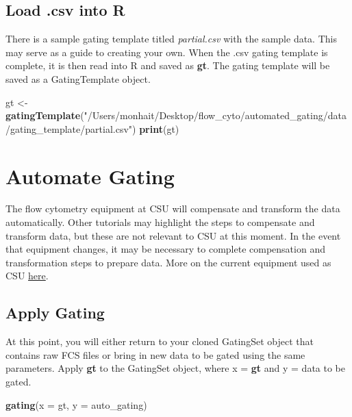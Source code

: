 \documentclass[]{book}
\newenvironment{Shaded}{\begin{snugshade}}{\end{snugshade}}
\newcommand{\DataTypeTok}[1]{\textcolor[rgb]{0.13,0.29,0.53}{#1}}
\newcommand{\KeywordTok}[1]{\textcolor[rgb]{0.13,0.29,0.53}{\textbf{#1}}}
\newcommand{\NormalTok}[1]{#1}
\newcommand{\StringTok}[1]{\textcolor[rgb]{0.31,0.60,0.02}{#1}}
\begin{document}
\hypertarget{load-.csv-into-r}{%
\section{Load .csv into R}\label{load-.csv-into-r}}

There is a sample gating template titled \emph{partial.csv} with the sample data. This may serve as a guide to creating your own. When the .csv gating template is complete, it is then read into R and saved as \textbf{gt}. The gating template will be saved as a GatingTemplate object.

\begin{Shaded}
\begin{Highlighting}[]
\NormalTok{gt <-}\StringTok{ }\KeywordTok{gatingTemplate}\NormalTok{(}\StringTok{"/Users/monhait/Desktop/flow_cyto/automated_gating/data/gating_template/partial.csv"}\NormalTok{)}
\KeywordTok{print}\NormalTok{(gt)}
\end{Highlighting}
\end{Shaded}

\hypertarget{automate-gating}{%
\chapter{Automate Gating}\label{automate-gating}}

The flow cytometry equipment at CSU will compensate and transform the data automatically. Other tutorials may highlight the steps to compensate and transform data, but these are not relevant to CSU at this moment. In the event that equipment changes, it may be necessary to complete compensation and transformation steps to prepare data. More on the current equipment used as CSU \href{https://www.umassmed.edu/facslab/instrument/core-cytek-aurora2/}{here}.

\hypertarget{apply-gating}{%
\section{Apply Gating}\label{apply-gating}}

At this point, you will either return to your cloned GatingSet object that contains raw FCS files or bring in new data to be gated using the same parameters. Apply \textbf{gt} to the GatingSet object, where x = \textbf{gt} and y = data to be gated.

\begin{Shaded}
\begin{Highlighting}[]
\KeywordTok{gating}\NormalTok{(}\DataTypeTok{x =}\NormalTok{ gt, }\DataTypeTok{y =}\NormalTok{ auto_gating)}
\end{Highlighting}
\end{Shaded}
\end{document}
